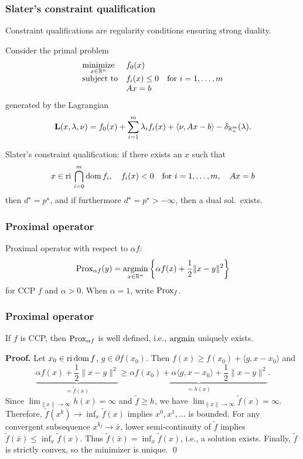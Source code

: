 \documentclass[10pt,mathserif]{beamer}
\begin{document}
\begin{frame}[plain]
\frametitle{Slater's constraint qualification}
Constraint qualifications are regularity conditions ensuring strong duality.

\vspace{0.2in}

Consider the primal problem
\[
\begin{array}{ll}
\underset{x\in \mathbb{R}^n}{\mbox{minimize}}&f_0(x)\\
\mbox{subject to}& f_i(x)\le 0\quad\text{for }i=1,\dots,m\\
&Ax=b
\end{array}
\]
generated by the Lagrangian
\[
\mathbf{L}(x,\lambda,\nu)=f_0(x)+\sum^m_{i=1}\lambda_if_i(x)+\langle \nu,Ax-b\rangle-\delta_{\mathbb{R}_+^m}(\lambda).
\]
\vspace{0.2in}

Slater's constraint qualification: if there exists an $x$ such that
\[
x\in \mathrm{ri}\, \bigcap^m_{i=0}\mathrm{dom}\, f_i,\quad
f_i(x)<0\quad\text{for }i=1,\dots,m,\quad Ax=b
\]
then $d^\star=p^\star$, and if furthermore $d^\star=p^\star>-\infty$, then a dual sol.\ exists.
\end{frame}


\begin{frame}
\frametitle{Proximal operator}

Proximal operator with respect to $\alpha f$:
\[
\mathrm{Prox}_{\alpha f}(y)=
\operatorname*{argmin}_{x\in \mathbb{R}^n}
\left\{
\alpha f(x)+\frac{1}{2}\|x-y\|^2
\right\}
\]
for CCP $f$ and $\alpha>0$.
When $\alpha=1$, write $\mathrm{Prox}_f$.

\end{frame}



\begin{frame}
\frametitle{Proximal operator}
If $f$ is CCP, then $\mathrm{Prox}_{\alpha f}$ is well defined, i.e., $\operatorname*{argmin}$ uniquely exists.

\vspace{0.2in}

\textbf{Proof.}
Let $x_0\in \mathrm{ri}\,\mathrm{dom}\, f$, $g\in \partial f(x_0)$.
Then $f(x)\ge f(x_0)+\langle g,x-x_0\rangle$ and 
\[
\underbrace{\alpha f(x)+\frac{1}{2}\|x-y\|^2}_{=\tilde{f}(x)}\ge \underbrace{\alpha f(x_0)+\alpha \langle g,x-x_0\rangle+\frac{1}{2}\|x-y\|^2}_{=h(x)}.
\]
Since $\lim_{\|x\|\rightarrow\infty}h(x)=\infty$ and $\tilde{f}\ge h$, we have $\lim_{\|x\|\rightarrow\infty}\tilde{f}(x)=\infty$.
Therefore, $\tilde{f}(x^k)\rightarrow \inf_{x}\tilde{f}(x)$ implies $x^0,x^1,\dots$ is bounded.
For any convergent subsequence $x^{k_j}\rightarrow \bar{x}$, lower semi-continuity of $\tilde{f}$ implies $\tilde{f}(\bar{x})\le \inf_x\tilde{f}(x)$.
Thus $\tilde{f}(\bar{x})= \inf_x\tilde{f}(x)$, i.e., a solution exists.
Finally, $\tilde{f}$ is strictly convex, so the minimizer is unique.
\qed

\end{frame}
\end{document}
